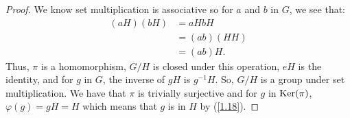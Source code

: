 \begin{proof}
    We know set multiplication is associative so for 
    $a$ and $b$ in $G$, we see that: \begin{align*}
        (aH)(bH) &= aHbH \\
        &= (ab)(HH) \tag{$H \nsub G$} \\
        &= (ab)H.
    \end{align*} Thus, $\pi$ is a homomorphism, $G / H$ is closed under this operation,
    $eH$ is the identity, and for $g$ in $G$, the inverse of $gH$ is $g^{-1}H$. 
    So, $G/H$ is a group under set multiplication.
    We have that $\pi$ is trivially surjective and for $g$ in $\operatorname{Ker}(\pi)$,
    $\varphi(g) = gH = H$ which means that $g$ is in $H$ by (\ref{1.18}).
\end{proof} 
